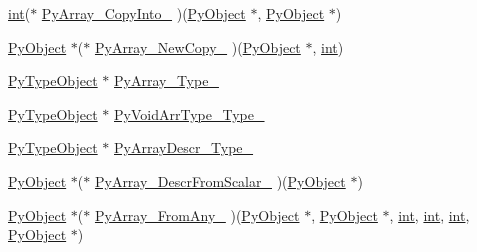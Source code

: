 \begin{DoxyCompactItemize}
\item 
\mbox{\hyperlink{warnings_8h_a74f207b5aa4ba51c3a2ad59b219a423b}{int}}($\ast$ \mbox{\hyperlink{structnpy__api_a7d5205f195d633125051fe3ade860062}{Py\+Array\+\_\+\+Copy\+Into\+\_\+}} )(\mbox{\hyperlink{_python27_2object_8h_aadc84ac7aed2cfa6f20c25f62bf3dac7}{Py\+Object}} $\ast$, \mbox{\hyperlink{_python27_2object_8h_aadc84ac7aed2cfa6f20c25f62bf3dac7}{Py\+Object}} $\ast$)
\item 
\mbox{\hyperlink{_python27_2object_8h_aadc84ac7aed2cfa6f20c25f62bf3dac7}{Py\+Object}} $\ast$($\ast$ \mbox{\hyperlink{structnpy__api_afceedb3de54ec824ebe1904f2518c178}{Py\+Array\+\_\+\+New\+Copy\+\_\+}} )(\mbox{\hyperlink{_python27_2object_8h_aadc84ac7aed2cfa6f20c25f62bf3dac7}{Py\+Object}} $\ast$, \mbox{\hyperlink{warnings_8h_a74f207b5aa4ba51c3a2ad59b219a423b}{int}})
\item 
\mbox{\hyperlink{_python27_2object_8h_a42a55dd6e973872c7a6bc61632070f6f}{Py\+Type\+Object}} $\ast$ \mbox{\hyperlink{structnpy__api_a90606f7c6be32c8206dc496d8925d984}{Py\+Array\+\_\+\+Type\+\_\+}}
\item 
\mbox{\hyperlink{_python27_2object_8h_a42a55dd6e973872c7a6bc61632070f6f}{Py\+Type\+Object}} $\ast$ \mbox{\hyperlink{structnpy__api_a00960472c4802c69109ddfa9bb54fca5}{Py\+Void\+Arr\+Type\+\_\+\+Type\+\_\+}}
\item 
\mbox{\hyperlink{_python27_2object_8h_a42a55dd6e973872c7a6bc61632070f6f}{Py\+Type\+Object}} $\ast$ \mbox{\hyperlink{structnpy__api_a098d32c95003331ae8cf6c968163153a}{Py\+Array\+Descr\+\_\+\+Type\+\_\+}}
\item 
\mbox{\hyperlink{_python27_2object_8h_aadc84ac7aed2cfa6f20c25f62bf3dac7}{Py\+Object}} $\ast$($\ast$ \mbox{\hyperlink{structnpy__api_a6a3a67e5494d56be530dac55b4f8c0e9}{Py\+Array\+\_\+\+Descr\+From\+Scalar\+\_\+}} )(\mbox{\hyperlink{_python27_2object_8h_aadc84ac7aed2cfa6f20c25f62bf3dac7}{Py\+Object}} $\ast$)
\item 
\mbox{\hyperlink{_python27_2object_8h_aadc84ac7aed2cfa6f20c25f62bf3dac7}{Py\+Object}} $\ast$($\ast$ \mbox{\hyperlink{structnpy__api_a52ea8d3ec3807fbbe3677778927be208}{Py\+Array\+\_\+\+From\+Any\+\_\+}} )(\mbox{\hyperlink{_python27_2object_8h_aadc84ac7aed2cfa6f20c25f62bf3dac7}{Py\+Object}} $\ast$, \mbox{\hyperlink{_python27_2object_8h_aadc84ac7aed2cfa6f20c25f62bf3dac7}{Py\+Object}} $\ast$, \mbox{\hyperlink{warnings_8h_a74f207b5aa4ba51c3a2ad59b219a423b}{int}}, \mbox{\hyperlink{warnings_8h_a74f207b5aa4ba51c3a2ad59b219a423b}{int}}, \mbox{\hyperlink{warnings_8h_a74f207b5aa4ba51c3a2ad59b219a423b}{int}}, \mbox{\hyperlink{_python27_2object_8h_aadc84ac7aed2cfa6f20c25f62bf3dac7}{Py\+Object}} $\ast$)

\end{DoxyCompactItemize}
